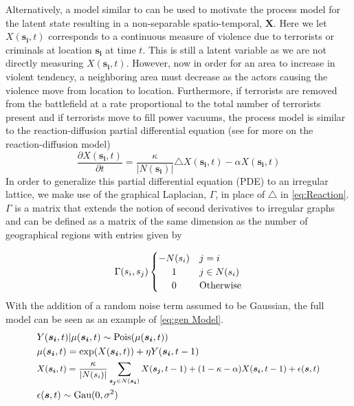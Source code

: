 \documentclass[11pt]{isuthesis}
\begin{document}
Alternatively, a model similar to \cite{short2008statistical} can be used to motivate the process model for the latent state resulting in a non-separable spatio-temporal, $\boldsymbol{X}$.  Here we let $X(\boldsymbol{s_i},t)$ corresponds to a continuous measure of violence due to terrorists or criminals at location $\boldsymbol{s_i}$ at time $t$. This is still a latent variable as we are not directly measuring $X(\boldsymbol{s_i},t)$.  However, now in order for an area to increase in violent tendency, a neighboring area must decrease as the actors causing the violence move from location to location.  Furthermore, if terrorists are removed from the battlefield at a rate proportional to the total number of terrorists present and if terrorists move to fill power vacuums, the process model is similar to the reaction-diffusion partial differential equation (see \cite{cressie2015statistics} for more on the reaction-diffusion model)
\begin{equation}
\frac{\partial X(\boldsymbol{s_i},t)}{\partial t}=\frac{\kappa}{|N(\boldsymbol{s_i})|} \triangle X(\boldsymbol{s_i},t)-\alpha X(\boldsymbol{s_i},t) \label{eq:Reaction}
\end{equation}
In order to generalize this partial differential equation (PDE) to an irregular lattice, we make use of the graphical Laplacian, $\Gamma$, in place of $\triangle$ in \eqref{eq:Reaction}. $\Gamma$ is a matrix that extends the notion of second derivatives to irregular graphs and can be defined as a matrix of the same dimension as the number of geographical regions with entries given by

\[
\Gamma (s_i,s_j)
\begin{cases} 
\hfill -N(s_i)   \hfill &  j=i \\
\hfill 1 \hfill & j\in N(s_i)  \\
\hfill 0 \hfill& \text{Otherwise}
\end{cases}
\]
With the addition of a random noise term assumed to be Gaussian, the full model can be seen as an example of \eqref{eq:gen Model}.
\begin{align}
& Y(\boldsymbol{s_i},t)|\mu(\boldsymbol{s_i},t) \sim \mbox{Pois}(\mu(\boldsymbol{s_i},t)) \label{eq:ReacDiffuse Model}\\
& \mu(\boldsymbol{s_i},t) = \exp(X(\boldsymbol{s_i},t)) + \eta Y(\boldsymbol{s_i},t-1) \nonumber \\
& \small X(\boldsymbol{s_i},t) = \frac{\kappa}{|N(s_i)|} \sum_{\boldsymbol{s_j}\in N(\boldsymbol{s_i})}X(\boldsymbol{s_j},t-1) + (1-\kappa-\alpha)  X(\boldsymbol{s_i},t-1) + \epsilon(\boldsymbol{s},t) \nonumber\\
&\epsilon(\boldsymbol{s},t) \sim \mbox{Gau}(0,\sigma^2) \nonumber
\end{align}
\end{document}
